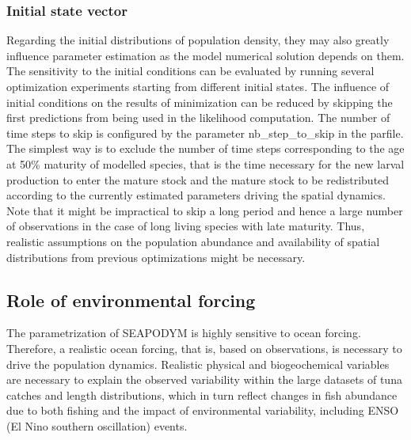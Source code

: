 \subsubsection{Initial state vector}

Regarding the initial distributions of population density, they may also greatly influence parameter estimation as the model numerical solution depends on them. The sensitivity to the initial conditions can be evaluated by running several optimization experiments starting from different initial states. The influence of initial conditions on the results of minimization can be reduced by skipping the first predictions from being used in the likelihood computation. The number of time steps to skip is configured by the parameter {\ttfamily nb\_step\_to\_skip} in the parfile. The simplest way is to exclude the number of time steps corresponding to the age at 50\% maturity of modelled species, that is the time necessary for the new larval production to enter the mature stock and the mature stock to be redistributed according to the currently estimated parameters driving the spatial dynamics. Note that it might be impractical to skip a long period and hence a large number of observations in the case of long living species with late maturity. Thus, realistic assumptions on the population abundance and availability of spatial distributions from previous optimizations might be necessary.


\subsection{Role of environmental forcing}

The parametrization of SEAPODYM is highly sensitive to ocean forcing. Therefore, a realistic ocean forcing, that is, based on observations, is necessary to drive the population dynamics. Realistic physical and biogeochemical variables are necessary to explain the observed variability within the large datasets of tuna catches and length distributions, which in turn reflect changes in fish abundance due to both fishing and the impact of environmental variability, including ENSO (El Nino southern oscillation) events.

